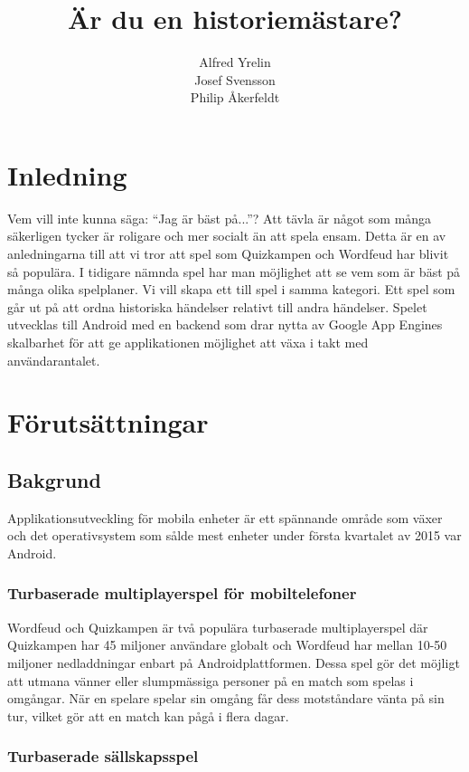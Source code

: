 \documentclass[12pt,a4paper]{article}
\author{Alfred Yrelin\\Josef Svensson\\Philip Åkerfeldt}
\title{Är du en historiemästare?}
\begin{document}
\maketitle
\newpage
\tableofcontents
\pagebreak

\section{Inledning}
Vem vill inte kunna säga: ``Jag är bäst på...''? Att tävla är något som många säkerligen tycker är roligare och mer socialt än att spela ensam. Detta är en av anledningarna till att vi tror att spel som Quizkampen och Wordfeud har blivit så populära\cite{quiz}. I tidigare nämnda spel har man möjlighet att se vem som är bäst på många olika spelplaner. Vi vill skapa ett till spel i samma kategori. Ett spel som går ut på att ordna historiska händelser relativt till andra händelser. Spelet utvecklas till Android med en backend som drar nytta av Google App Engines skalbarhet för att ge applikationen möjlighet att växa i takt med användarantalet. 

\section{Förutsättningar}

\subsection{Bakgrund}
Applikationsutveckling för mobila enheter är ett spännande område som växer\cite{trendforce} och det operativsystem som sålde mest enheter under första kvartalet av 2015 var Android. 

\subsubsection{Turbaserade multiplayerspel för mobiltelefoner}
Wordfeud och Quizkampen är två populära turbaserade multiplayerspel där Quizkampen har 45 miljoner användare globalt\cite{quiz} och Wordfeud har mellan 10-50 miljoner nedladdningar enbart på Androidplattformen\cite{wordfeud}. Dessa spel gör det möjligt att utmana vänner eller slumpmässiga personer på en match som spelas i omgångar. När en spelare spelar sin omgång får dess motståndare vänta på sin tur, vilket gör att en match kan pågå i flera dagar.

\subsubsection{Turbaserade sällskapsspel}
\end{document}
